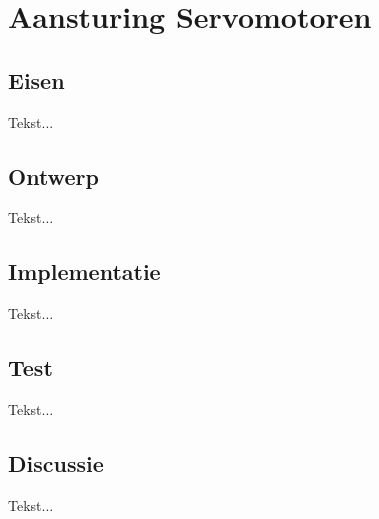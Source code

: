 \chapter[Aansturing Servomotoren]{Aansturing Servomotoren} \label {chapter:servomotoren}

	\section{Eisen}
		Tekst...
	\section{Ontwerp}
		Tekst...
	\section{Implementatie}
			Tekst...
	\section{Test}
			Tekst...
	\section{Discussie}
			Tekst...
